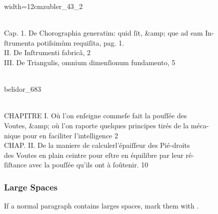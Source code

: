\begin{sampleImageSmall}[ 1]{width=12cm}{zubler_43_2}

\begin{typeLatin}
 \\
Cap. 1.  De Chorographia generatim: quid ſit, &amp; que ad eam In-\\
 ſtrumenta poti{ſs}imùm requiſita,  pag. 1. \\
II.  De Inſtrumenti fabricâ,  2 \\
III.  De Triangul{is}, omnium dimenſionum fundamento,  5 \\
\someText \\
\end{typeLatin}
\end{sampleImageSmall}


\begin{sampleImage}[ 2]{belidor_683}

\begin{typeLatin}
 \\
CHAPITRE I. Où l'on enſeigne comme\lwr ſe fait la pouſſée des \\
 Voutes, &amp; où l'on raporte quelques principes tirés de la méca- \\
 nique pour en faciliter l'intelligence  2 \\
CHAP. II.  De la maniere de calculer\lwr l'épaiſſeur des Pié-droits \\
 des Voutes en plain ceintre pour eſtre en équilibre par leur ré- \\
 ſiſtance avec la pouſſée qu'ils ont à ſoûtenir.  10  \\
\end{typeLatin}
\end{sampleImage}


\subsubsection{Large Spaces}
\begin{mainrule}
If a normal paragraph contains larges spaces, mark them with .
\end{mainrule}

